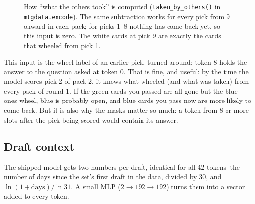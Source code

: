 \documentclass[11pt,letterpaper]{article}
\newcommand{\code}[1]{\texttt{\small #1}}
\begin{document}
\begin{figure}[!htbp]
\centering
{}
\caption{How ``what the others took'' is computed (\code{taken\_by\_others()} in \code{mtgdata.encode}).
The same subtraction works for every pick from 9 onward in each pack; for picks 1--8 nothing has come back
yet, so this input is zero. The white cards at pick 9 are exactly the cards that wheeled from pick 1.}
\label{fig:others}
\end{figure}

This input is the wheel label of an earlier pick, turned around: token 8 holds the answer to the question
asked at token 0. That is fine, and useful: by the time the model scores pick 2 of pack 2, it knows what wheeled
(and what was taken) from every pack of round 1. If the green cards you passed are all gone but the blue
ones wheel, blue is probably open, and blue cards you pass now are more likely to come back. But it is also
why the masks matter so much: a token from 8 or more slots after the pick being scored would contain its answer.

\subsection{Draft context}\label{sec:ctx}

The shipped model gets two numbers per draft, identical for all 42 tokens: the number of days since the
set's first draft in the data, divided by 30, and $\ln(1+\text{days})/\ln 31$. A small MLP
($2\to192\to192$) turns them into a vector added to every token.
\end{document}
